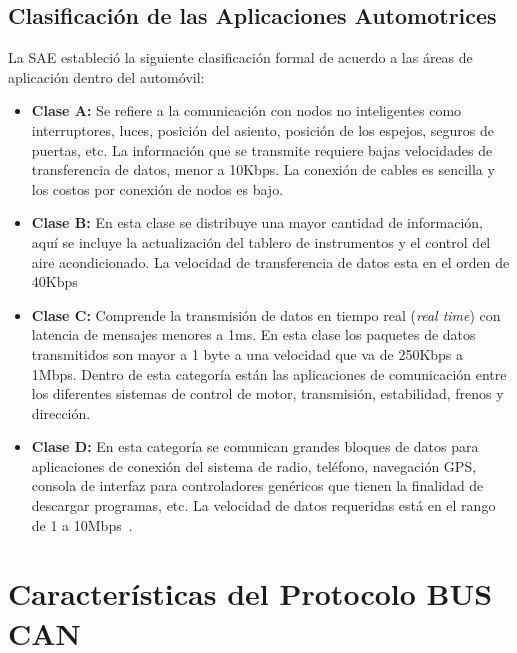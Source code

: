 \subsection {Clasificación de las Aplicaciones Automotrices}
La SAE estableció la siguiente clasificación formal de acuerdo a las áreas de aplicación dentro del automóvil:
\begin {itemize} 

\item \textbf{Clase A:} Se refiere a la comunicación con nodos no inteligentes como interruptores, luces, posición del asiento, posición de los espejos, seguros de puertas, etc. 
La información que se transmite requiere bajas velocidades de transferencia de datos, menor a 10Kbps.
La conexión de cables es sencilla y los costos por conexión de nodos es bajo.

\item \textbf {Clase B:} En esta clase se distribuye una mayor cantidad de información, aquí se incluye la actualización del tablero de instrumentos y el control del aire acondicionado. 
La velocidad de transferencia de datos esta en el orden de 40Kbps

\item \textbf{Clase C:} Comprende la transmisión de datos en tiempo real (\textit{real time}) con latencia de mensajes menores a 1ms. 
En esta clase los paquetes de datos transmitidos son mayor a 1 byte a una velocidad que va de 250Kbps a 1Mbps. 
Dentro de esta categoría están las aplicaciones de comunicación entre los diferentes sistemas de control  de motor, transmisión, estabilidad, frenos y dirección.

\item \textbf{Clase D:} En esta categoría se comunican grandes bloques de datos para aplicaciones de conexión del sistema de radio, teléfono, navegación GPS, consola de interfaz para controladores genéricos que tienen la finalidad de descargar programas, etc. 
La velocidad de datos requeridas está en el rango de 1 a 10Mbps~\cite{DSEEPC}.
\end{itemize}

\section {Características del Protocolo BUS CAN}

